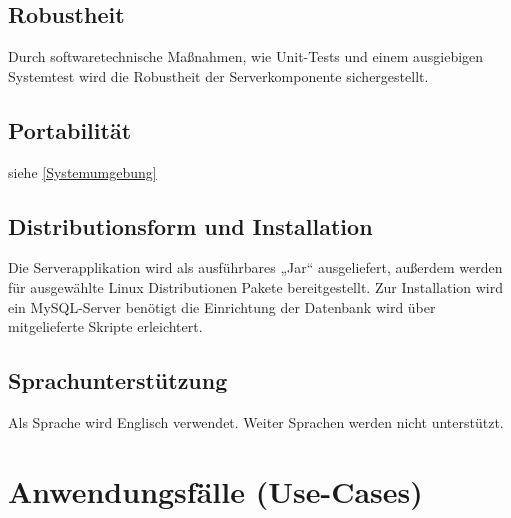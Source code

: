 \documentclass[a4paper,10pt,titlepage,parskip=true]{article}
\makeatletter
\newcommand\novspace{\@minipagetrue}
\newenvironment{owncompactitem}{%
\compactitem
}{%
\@finalstrut\@arstrutbox
\@nameuse{endcompactitem}%
\aftergroup\let\aftergroup\@finalstrut\aftergroup\@gobble
}
\newenvironment{owncompactenum}{%
\compactenum
}{%
\@finalstrut\@arstrutbox
\@nameuse{endcompactenum}%
\aftergroup\let\aftergroup\@finalstrut\aftergroup\@gobble
}
\newcommand{\usecase}[7]
{\subsection{#1}
\setlength{\extrarowheight}{2pt}
\begin{tabular}{|p{0.2\textwidth}|p{0.9\textwidth}|}
\hline
  Akteure & #2\\\hline
  Ziel & #3\\\hline
  Vorbedingungen & \novspace
  	\begin{owncompactitem}[-] #4 \end{owncompactitem} \\\hline
  Normalablauf & \vspace{-7pt}
  	\begin{owncompactenum}[1.] #6 \end{owncompactenum} \\\hline
  Nachbedingungen & \novspace
  	\begin{owncompactitem}[-] #5 \end{owncompactitem} \\\hline
  #7
\end{tabular}
}
\newcommand{\sonderfall}[4][\empty]
{
Sonderfall #2 & \vspace{-10pt}
	\textit{#3}
	\begin{owncompactenum}[{#2}.1] {#4} \end{owncompactenum}
  	\ifthenelse{\equal{#1}{\empty}}
    	{\\\hline} %
    	{\ensuremath{\rightarrow} #1 \\ [+1pt] \hline} %

}
\newcommand{\kurzersonderfall}[3][\empty]
{
Sonderfall #2 & \vspace{-10pt}
	\textit{#3}
  	\ifthenelse{\equal{#1}{\empty}}
    	{\\\hline} %
    	{\\&\ensuremath{\rightarrow} #1 \\ [+1pt] \hline} %

}
\newcommand{\sondernachbedingung}[1]
{
Nachbedingungen im Sonderfall& \novspace
	\begin{owncompactitem}[-]
		#1
	\end{owncompactitem} \\\hline
}
\makeatother
\begin{document}
\subsection{Robustheit}
Durch softwaretechnische Maßnahmen, wie Unit-Tests und einem ausgiebigen Systemtest wird die Robustheit der Serverkomponente sichergestellt.
\subsection{Portabilität}
siehe \ref{Systemumgebung}
\subsection{Distributionsform und Installation}
Die Serverapplikation wird als ausführbares „Jar“ ausgeliefert, außerdem werden für ausgewählte Linux Distributionen Pakete bereitgestellt. Zur Installation wird ein MySQL-Server benötigt die Einrichtung der Datenbank wird über mitgelieferte Skripte erleichtert.
\subsection{Sprachunterstützung}
Als Sprache wird Englisch verwendet. Weiter Sprachen werden nicht unterstützt.

\clearpage
\section{Anwendungsfälle (Use-Cases)}




{%
}{%
}{%
}{%
}{%
}

{%
}{%
}

{%
}
\end{document}
